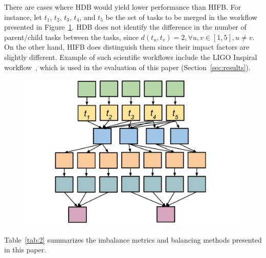 There are cases where HDB would yield lower performance than HIFB. For instance, let $t_1$, $t_2$, $t_3$, $t_4$, and $t_5$ be the set of tasks to be merged in the workflow presented in Figure~\ref{fig:imbalance_hifb_hdb}. HDB does not identify the difference in the number of parent/child tasks between the tasks, since $d(t_u,t_v) = 2, \forall u,v \in [1,5], u \neq v$. On the other hand, HIFB does distinguish them since their impact factors are slightly different. Example of such scientific workflows include the LIGO Inspiral workflow~\cite{LIGO}, which is used in the evaluation of this paper (Section~\ref{sec:results}).

\begin{figure}[!htb]
	\centering
	\includegraphics[width=0.85\linewidth]{figures/balance/figure11.pdf}
	\label{fig:imbalance_hifb_hdb}
\end{figure}

Table~\ref{tab:2} summarizes the imbalance metrics and balancing methods presented in this paper. 

